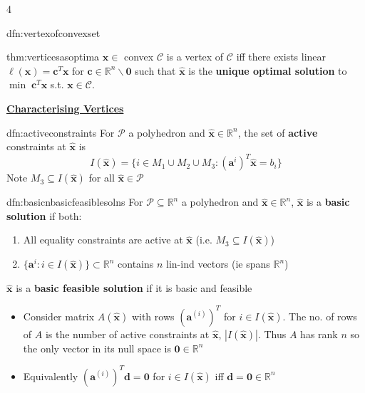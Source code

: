 \documentclass[landscape, 8pt]{extarticle}
\begin{document}
\begin{multicols*}{4}
\begin{mdfn}{dfn:vertexofconvexset}{ }
		\end{mdfn}
		
		
		\begin{mthm}{thm:verticesasoptima}{ }
			$\mathbf{\hat{x}}\in$ convex $\mathcal{C}$ is a vertex of $\mathcal{C}$ iff there exists linear $\ell(\mathbf{x}) = \mathbf{c}^T\mathbf{x}$ for $\mathbf{c}\in \mathbb{R}^n\backslash\mathbf{0}$ such that $\mathbf{\hat{x}}$ is the \textbf{unique optimal solution} to $\min \; \mathbf{c}^T \mathbf{x}$ s.t. $\mathbf{x}\in \mathcal{C}$.
			
		\end{mthm}
		
		
		{\tiny\textbf{\underline{Characterising Vertices}}}
		
		
		\begin{mdfn}{dfn:activeconstraints}{ }
			For $\mathcal{P}$ a polyhedron and $\mathbf{\hat{x}}\in \mathbb{R}^n$, the set of \textbf{active}  constraints at $\mathbf{\hat{x}}$ is $$
			I(\mathbf{\hat{x}}) = \{i\in M_1 \cup M_2 \cup M_3 : (\mathbf{a}^i)^T\mathbf{\hat{x}} = b_i\}
			$$
			Note $M_3 \subseteq I(\mathbf{\hat{x}})$ for all $\mathbf{\hat{x}}\in \mathcal{P}$
			
		\end{mdfn}
		
		
		\begin{mdfn}{dfn:basicnbasicfeasiblesolns}{ }
			For $\mathcal{P} \subseteq \mathbb{R}^n$ a polyhedron and $\mathbf{\hat{x}}\in \mathbb{R}^n$, $\mathbf{\hat{x}}$ is a \textbf{basic solution} if both:\\
			\begin{enumerate}[label=(\roman*)]
				\item All equality constraints are active at $\mathbf{\hat{x}}$ (i.e. $M_3 \subseteq I(\mathbf{\hat{x}})$)
				\item $\{\mathbf{a}^i : i \in I(\mathbf{\hat{x}})\} \subset \mathbb{R}^n$ contains $n$ lin-ind vectors (ie spans $\mathbb{R}^n$)
			\end{enumerate} 
			$\mathbf{\hat{x}}$ is a \textbf{basic feasible solution} if it is basic and feasible
			
			\begin{itemize}
				\item Consider matrix $A(\mathbf{\hat{x}})$ with rows $(\mathbf{a}^{(i)})^T$ for $i\in I(\mathbf{\hat{x}})$. The no. of rows of $A$ is the number of active constraints at $\mathbf{\hat{x}}$, $\left|I(\mathbf{\hat{x}})\right|$. Thus $A$ has rank $n$ so the only vector in its null space is $\mathbf{0}\in \mathbb{R}^n$
				\item Equivalently $(\mathbf{a}^{(i)})^T \mathbf{d} = \mathbf{0}$ for $i\in I(\mathbf{\hat{x}})$ iff $\mathbf{d} = \mathbf{0}\in \mathbb{R}^n$
			\end{itemize}
			

\end{mdfn}
\end{multicols*}
\end{document}

